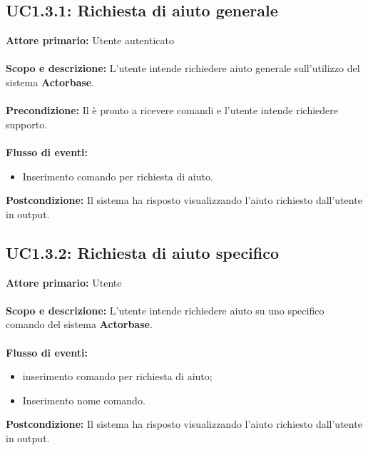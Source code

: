 \documentclass{scalatekids-article}
\begin{document}
\subsection{UC1.3.1: Richiesta di aiuto generale}
\textbf{Attore primario:} Utente autenticato\\ \\
\textbf{Scopo e descrizione:} L'utente intende richiedere aiuto generale sull'utilizzo del sistema \textbf{Actorbase}.\\ \\
\textbf{Precondizione:} Il  è pronto a ricevere comandi e l'utente intende richiedere supporto.\\ \\
\textbf{Flusso di eventi:}
\begin{itemize}
\item Inserimento comando per richiesta di aiuto.
\end{itemize}
\textbf{Postcondizione:} Il sistema ha risposto visualizzando l'aiuto richiesto dall'utente in output.
\subsection{UC1.3.2: Richiesta di aiuto specifico}
\textbf{Attore primario:} Utente\\ \\
\textbf{Scopo e descrizione:} L'utente intende richiedere aiuto su uno specifico comando del sistema \textbf{Actorbase}.\\ \\
\textbf{Flusso di eventi:}
\begin{itemize}
\item inserimento comando per richiesta di aiuto;
\item Inserimento nome comando.
\end{itemize}
\textbf{Postcondizione:} Il sistema ha risposto visualizzando l'aiuto richiesto dall'utente in output.
\end{document}

